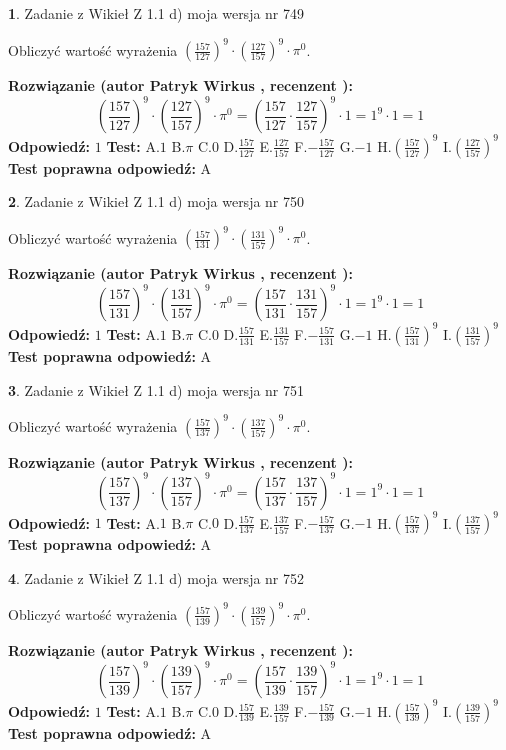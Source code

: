 \documentclass[12pt, a4paper]{article}
\theoremstyle{definition} %
\newtheorem{zad}{}
\newcommand{\zadStart}[1]{\begin{zad}#1\newline}
\newcommand{\zadStop}{\end{zad}}
\newcommand{\rozwStart}[2]{\noindent \textbf{Rozwiązanie (autor #1 , recenzent #2): }\newline}
\newcommand{\rozwStop}{\newline}
\newcommand{\odpStart}{\noindent \textbf{Odpowiedź:}\newline}
\newcommand{\odpStop}{\newline}
\newcommand{\testStart}{\noindent \textbf{Test:}\newline}
\newcommand{\testStop}{\newline}
\newcommand{\kluczStart}{\noindent \textbf{Test poprawna odpowiedź:}\newline}
\newcommand{\kluczStop}{\newline}
\begin{document}
\zadStart{Zadanie z Wikieł Z 1.1 d) moja wersja nr 749}

Obliczyć wartość wyrażenia $(\frac{157}{127})^{9} \cdot (\frac{127}{157})^{9} \cdot \pi^{0}$.
\zadStop
\rozwStart{Patryk Wirkus}{}
$$(\frac{157}{127})^{9} \cdot (\frac{127}{157})^{9} \cdot \pi^{0} = (\frac{157}{127} \cdot \frac{127}{157})^{9} \cdot 1 = 1^{9} \cdot 1 = 1$$
\rozwStop
\odpStart
$1$
\odpStop
\testStart
A.$1$ B.$\pi$ C.$0$ D.$\frac{157}{127}$ E.$\frac{127}{157}$
F.$-\frac{157}{127}$ G.$-1$
H.$(\frac{157}{127})^{9}$
I.$(\frac{127}{157})^{9}$
\testStop
\kluczStart
A
\kluczStop



\zadStart{Zadanie z Wikieł Z 1.1 d) moja wersja nr 750}

Obliczyć wartość wyrażenia $(\frac{157}{131})^{9} \cdot (\frac{131}{157})^{9} \cdot \pi^{0}$.
\zadStop
\rozwStart{Patryk Wirkus}{}
$$(\frac{157}{131})^{9} \cdot (\frac{131}{157})^{9} \cdot \pi^{0} = (\frac{157}{131} \cdot \frac{131}{157})^{9} \cdot 1 = 1^{9} \cdot 1 = 1$$
\rozwStop
\odpStart
$1$
\odpStop
\testStart
A.$1$ B.$\pi$ C.$0$ D.$\frac{157}{131}$ E.$\frac{131}{157}$
F.$-\frac{157}{131}$ G.$-1$
H.$(\frac{157}{131})^{9}$
I.$(\frac{131}{157})^{9}$
\testStop
\kluczStart
A
\kluczStop



\zadStart{Zadanie z Wikieł Z 1.1 d) moja wersja nr 751}

Obliczyć wartość wyrażenia $(\frac{157}{137})^{9} \cdot (\frac{137}{157})^{9} \cdot \pi^{0}$.
\zadStop
\rozwStart{Patryk Wirkus}{}
$$(\frac{157}{137})^{9} \cdot (\frac{137}{157})^{9} \cdot \pi^{0} = (\frac{157}{137} \cdot \frac{137}{157})^{9} \cdot 1 = 1^{9} \cdot 1 = 1$$
\rozwStop
\odpStart
$1$
\odpStop
\testStart
A.$1$ B.$\pi$ C.$0$ D.$\frac{157}{137}$ E.$\frac{137}{157}$
F.$-\frac{157}{137}$ G.$-1$
H.$(\frac{157}{137})^{9}$
I.$(\frac{137}{157})^{9}$
\testStop
\kluczStart
A
\kluczStop



\zadStart{Zadanie z Wikieł Z 1.1 d) moja wersja nr 752}

Obliczyć wartość wyrażenia $(\frac{157}{139})^{9} \cdot (\frac{139}{157})^{9} \cdot \pi^{0}$.
\zadStop
\rozwStart{Patryk Wirkus}{}
$$(\frac{157}{139})^{9} \cdot (\frac{139}{157})^{9} \cdot \pi^{0} = (\frac{157}{139} \cdot \frac{139}{157})^{9} \cdot 1 = 1^{9} \cdot 1 = 1$$
\rozwStop
\odpStart
$1$
\odpStop
\testStart
A.$1$ B.$\pi$ C.$0$ D.$\frac{157}{139}$ E.$\frac{139}{157}$
F.$-\frac{157}{139}$ G.$-1$
H.$(\frac{157}{139})^{9}$
I.$(\frac{139}{157})^{9}$
\testStop
\kluczStart
A
\kluczStop
\end{document}

